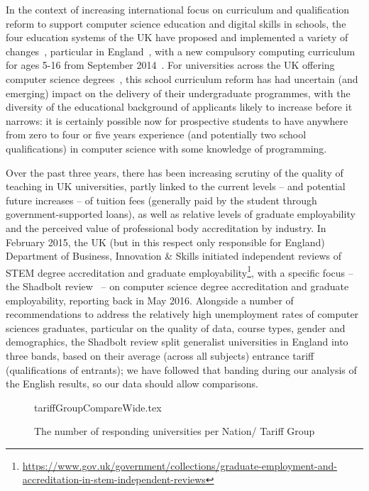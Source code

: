 \documentclass[english,submission]{programming}
\begin{document}
In the context of increasing international focus on curriculum and
qualification reform to support computer science education and digital
skills in schools, the four education systems of the UK have proposed
and implemented a variety of
changes~\cite{rs:2012,brown-et-al-sigcse2013,crick+moller-wipsce2015},
particular in England~\cite{brown-et-al-toce2014}, with a new
compulsory computing curriculum for ages 5-16 from September
2014~\cite{dfecomp:2013}. For universities across the UK offering
computer science degrees~\cite{qaacomp:2016}, this school curriculum
reform has had uncertain (and emerging) impact on the delivery of
their undergraduate programmes, with the diversity of the educational
background of applicants likely to increase before it narrows: it is
certainly possible now for prospective students to have anywhere from
zero to four or five years experience (and potentially two school
qualifications) in computer science with some knowledge of
programming.

Over the past three years, there has been increasing scrutiny of the
quality of teaching in UK universities, partly linked to the current
levels -- and potential future increases -- of tuition fees (generally
paid by the student through government-supported loans), as well as
relative levels of graduate employability and the perceived value of
professional body accreditation by industry. In February 2015, the UK
(but in this respect only responsible for England) Department of
Business, Innovation \& Skills initiated independent reviews of STEM
degree accreditation and graduate
employability\footnote{\url{https://www.gov.uk/government/collections/graduate-employment-and-accreditation-in-stem-independent-reviews}},
with a specific focus -- the Shadbolt review~\cite{shadbolt:2016} --
on computer science degree accreditation and graduate employability,
reporting back in May 2016. Alongside a number of recommendations to
address the relatively high unemployment rates of computer sciences
graduates, particular on the quality of data, course types, gender and
demographics, the Shadbolt review split generalist universities in
England into three bands, based on their average (across all subjects)
entrance tariff (qualifications of entrants); we have followed that
banding during our analysis of the English results, so our data should
allow comparisons.

\begin{figure}
\begin{center}
{tariffGroupCompareWide.tex}
\caption{The number of responding universities per Nation/   
 Tariff Group\label{fig:TG}}
\end{center}
\end{figure}
\end{document}
